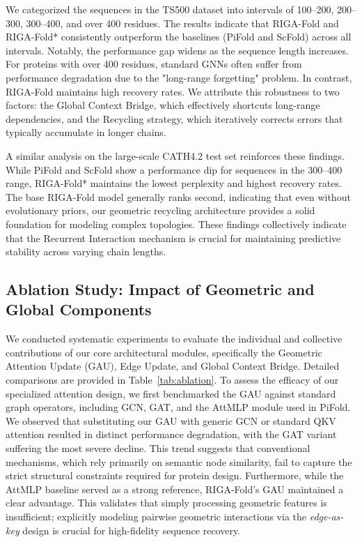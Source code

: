 \documentclass{article}
\theoremstyle{plain}
\theoremstyle{definition}
\theoremstyle{remark}
\begin{document}
{We categorized the sequences in the TS500 dataset into intervals of 100--200, 200--300, 300--400, and over 400 residues. The results indicate that RIGA-Fold and RIGA-Fold* consistently outperform the baselines (PiFold and ScFold) across all intervals. Notably, the performance gap widens as the sequence length increases. For proteins with over 400 residues, standard GNNs often suffer from performance degradation due to the "long-range forgetting" problem. In contrast, RIGA-Fold maintains high recovery rates. We attribute this robustness to two factors: the Global Context Bridge, which effectively shortcuts long-range dependencies, and the Recycling strategy, which iteratively corrects errors that typically accumulate in longer chains.

A similar analysis on the large-scale CATH4.2 test set reinforces these findings. While PiFold and ScFold show a performance dip for sequences in the 300--400 range, RIGA-Fold* maintains the lowest perplexity and highest recovery rates. The base RIGA-Fold model generally ranks second, indicating that even without evolutionary priors, our geometric recycling architecture provides a solid foundation for modeling complex topologies. These findings collectively indicate that the Recurrent Interaction mechanism is crucial for maintaining predictive stability across varying chain lengths.

\subsection{Ablation Study: Impact of Geometric and Global Components}

We conducted systematic experiments to evaluate the individual and collective contributions of our core architectural modules, specifically the Geometric Attention Update (GAU), Edge Update, and Global Context Bridge. Detailed comparisons are provided in Table~\ref{tab:ablation}. To assess the efficacy of our specialized attention design, we first benchmarked the GAU against standard graph operators, including GCN, GAT, and the AttMLP module used in PiFold. We observed that substituting our GAU with generic GCN or standard QKV attention resulted in distinct performance degradation, with the GAT variant suffering the most severe decline. This trend suggests that conventional mechanisms, which rely primarily on semantic node similarity, fail to capture the strict structural constraints required for protein design. Furthermore, while the AttMLP baseline served as a strong reference, RIGA-Fold's GAU maintained a clear advantage. This validates that simply processing geometric features is insufficient; explicitly modeling pairwise geometric interactions via the \textit{edge-as-key} design is crucial for high-fidelity sequence recovery.

}
\end{document}
